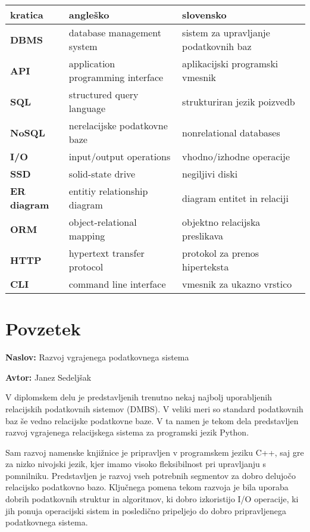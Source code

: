 \documentclass[a4paper,12pt,openright]{book}
\newcommand{\ttitle}{Razvoj vgrajenega podatkovnega sistema}
\newcommand{\tauthor}{Janez Sedeljšak}
\newcommand{\clearemptydoublepage}{\newpage{\pagestyle{empty}\cleardoublepage}}
\begin{document}
\noindent\begin{tabular}{p{}|p{}|p{}}    %
  {\bf kratica} & {\bf angleško}                              & {\bf slovensko} \\ \hline
  {\bf DBMS} & database management system & sistem za upravljanje podatkovnih baz \\
  {\bf API} & application programming interface & aplikacijski programski vmesnik \\
  {\bf SQL} & structured query language & strukturiran jezik poizvedb \\
  {\bf NoSQL} & nerelacijske podatkovne baze & nonrelational databases \\
  {\bf I/O} & input/output operations & vhodno/izhodne operacije \\
  {\bf SSD} & solid-state drive & negiljivi diski \\
  {\bf ER diagram} & entitiy relationship diagram & diagram entitet in relaciji \\
  {\bf ORM} & object-relational mapping & objektno relacijska preslikava \\
  {\bf HTTP} & hypertext transfer protocol & protokol za prenos hiperteksta \\
  {\bf CLI} & command line interface & vmesnik za ukazno vrstico \\
\end{tabular}


\clearemptydoublepage

{}
\chapter*{Povzetek}

\noindent\textbf{Naslov:} \ttitle
\bigskip

\noindent\textbf{Avtor:} \tauthor
\bigskip

\noindent V diplomskem delu je predstavljenih trenutno nekaj najbolj uporabljenih relacijskih podatkovnih sistemov (DMBS). V veliki meri so standard podatkovnih baz še vedno relacijske podatkovne baze. V ta namen je tekom dela predstavljen razvoj vgrajenega relacijskega sistema za programski jezik Python.

Sam razvoj namenske knjižnice je pripravljen v programskem jeziku C++, saj gre za nizko nivojski jezik, kjer imamo visoko fleksibilnost pri upravljanju s pomnilniku. Predstavljen je razvoj vseh potrebnih segmentov za dobro delujočo relacijsko podatkovno bazo. Ključnega pomena tekom razvoja je bila uporaba dobrih podatkovnih struktur in algoritmov, ki dobro izkoristijo I/O operacije, ki jih ponuja operacijski sistem in posledično pripeljejo do dobro pripravljenega podatkovnega sistema.
\end{document}
